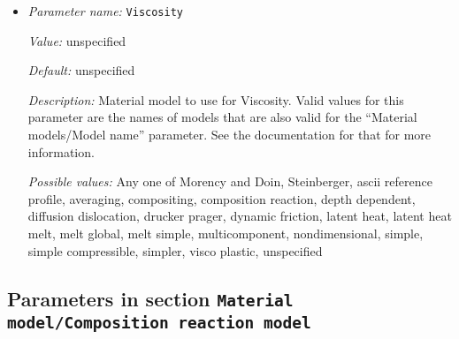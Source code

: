 \begin{itemize}
{\it Value:} unspecified


{\it Default:} unspecified


{\it Description:} Material model to use for Thermal expansion coefficient. Valid values for this parameter are the names of models that are also valid for the ``Material models/Model name'' parameter. See the documentation for that for more information.


{\it Possible values:} Any one of Morency and Doin, Steinberger, ascii reference profile, averaging, compositing, composition reaction, depth dependent, diffusion dislocation, drucker prager, dynamic friction, latent heat, latent heat melt, melt global, melt simple, multicomponent, nondimensional, simple, simple compressible, simpler, visco plastic, unspecified
\item {\it Parameter name:} {\tt Viscosity}
\label{parameters:Material model/Compositing/Viscosity}


{\it Value:} unspecified


{\it Default:} unspecified


{\it Description:} Material model to use for Viscosity. Valid values for this parameter are the names of models that are also valid for the ``Material models/Model name'' parameter. See the documentation for that for more information.


{\it Possible values:} Any one of Morency and Doin, Steinberger, ascii reference profile, averaging, compositing, composition reaction, depth dependent, diffusion dislocation, drucker prager, dynamic friction, latent heat, latent heat melt, melt global, melt simple, multicomponent, nondimensional, simple, simple compressible, simpler, visco plastic, unspecified
\end{itemize}

\subsection{Parameters in section \tt Material model/Composition reaction model}
\label{parameters:Material_20model/Composition_20reaction_20model}

